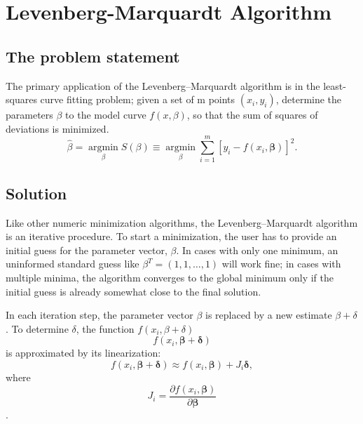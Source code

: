 \documentclass[20pt, a4paper]{report}
\begin{document}
		\section{Levenberg-Marquardt Algorithm}
		
		\subsection{The problem statement}
		
		The primary application of the Levenberg–Marquardt algorithm is in the least-squares curve fitting problem; given a set of m points $(x_{i}, y_{i})$, determine the parameters $\beta$ to the model curve $f(x,\beta)$, so that the sum of squares of deviations is minimized.
		$${\displaystyle {\hat {\beta }}=\operatorname*{argmin} \limits _{\beta }S(\beta )\equiv \operatorname {argmin} \limits _{\beta }\sum _{i=1}^{m}[y_{i}-f(x_{i},{\boldsymbol {\beta }})]^{2}.}$$
		\subsection{Solution}
		Like other numeric minimization algorithms, the Levenberg–Marquardt algorithm is an iterative procedure. To start a minimization, the user has to provide an initial guess for the parameter vector, $\beta$. In cases with only one minimum, an uninformed standard guess like $\beta^{T} = (1, 1,\ldots, 1)$ will work fine; in cases with multiple minima, the algorithm converges to the global minimum only if the initial guess is already somewhat close to the final solution.
		
		 In each iteration step, the parameter vector $\beta$ is replaced by a new estimate $\beta + \delta$. To determine $\delta$, the function $f ( x_{i} , \beta + \delta )$ $${\displaystyle f(x_{i},{\boldsymbol {\beta }}+{\boldsymbol {\delta }})}$$ is approximated by its linearization: $${\displaystyle f(x_{i},{\boldsymbol {\beta }}+{\boldsymbol {\delta }})\approx f(x_{i},{\boldsymbol {\beta }})+J_{i}{\boldsymbol {\delta }},}$$
		 where $${\displaystyle J_{i}={\frac {\partial f(x_{i},{\boldsymbol {\beta }})}{\partial {\boldsymbol {\beta }}}}}$$.
		 
\end{document}
